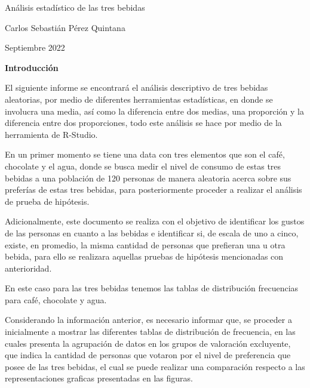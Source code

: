 \documentclass{article} %
\begin{document}


\noindent An\'{a}lisis estad\'{i}stico de las tres bebidas

\noindent Carlos Sebasti\'{a}n P\'{e}rez Quintana

\noindent Septiembre 2022

\noindent 

\noindent 


{\bf  Introducci\'{o}n }

\noindent El siguiente informe se encontrar\'{a} el an\'{a}lisis descriptivo de tres bebidas aleatorias, por medio de diferentes herramientas estad\'{i}sticas, en donde se involucra una media, as\'{i} como la diferencia entre dos medias, una proporci\'{o}n y la diferencia entre dos proporciones, todo este an\'{a}lisis se hace por medio de la herramienta de R-Studio.  

\noindent 

\noindent En un primer momento se tiene una data con tres elementos que son el caf\'{e}, chocolate y el agua, donde se busca medir el nivel de consumo de estas tres bebidas a una poblaci\'{o}n de 120 personas de manera aleatoria acerca sobre sus prefer\'{i}as de estas tres bebidas, para posteriormente proceder a realizar el an\'{a}lisis de prueba de hip\'{o}tesis.

\noindent 

\noindent Adicionalmente, este documento se realiza con el objetivo de identificar los gustos de las personas en cuanto a las bebidas e identificar si, de escala de uno a cinco, existe, en promedio, la misma cantidad de personas que prefieran una u otra bebida, para ello se realizara aquellas pruebas de hip\'{o}tesis mencionadas con anterioridad. 

\noindent 

\noindent En este caso para las tres bebidas tenemos las tablas de distribuci\'{o}n frecuencias para caf\'{e}, chocolate y agua.

\noindent Considerando la informaci\'{o}n anterior, es necesario informar que, se proceder a inicialmente a mostrar las diferentes tablas de distribuci\'{o}n de frecuencia, en las cuales presenta la agrupaci\'{o}n de datos en los grupos de valoraci\'{o}n excluyente, que indica la cantidad de personas que votaron por el nivel de preferencia que posee de las tres bebidas, el cual se puede realizar una comparaci\'{o}n respecto a las representaciones graficas presentadas en las figuras. 
\end{document}
